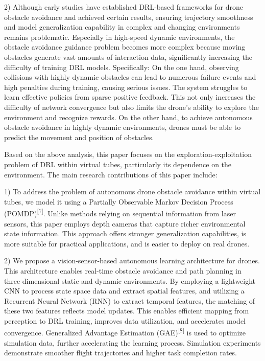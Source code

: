 \documentclass[preprint,12pt,authoryear]{elsarticle}
\begin{document}
2)  Although early studies have established DRL-based frameworks for drone obstacle avoidance and achieved certain results, ensuring trajectory smoothness and model generalization capability in complex and changing environments remains problematic. Especially in high-speed dynamic environments, the obstacle avoidance guidance problem becomes more complex because moving obstacles generate vast amounts of interaction data, significantly increasing the difficulty of training DRL models. Specifically: On the one hand, observing collisions with highly dynamic obstacles can lead to numerous failure events and high penalties during training, causing serious issues. The system struggles to learn effective policies from sparse positive feedback. This not only increases the difficulty of network convergence but also limits the drone's ability to explore the environment and recognize rewards. On the other hand, to achieve autonomous obstacle avoidance in highly dynamic environments, drones must be able to predict the movement and position of obstacles.

Based on the above analysis, this paper focuses on the exploration-exploitation problem of DRL within virtual tubes, particularly its dependence on the environment. The main research contributions of this paper include:

1)  To address the problem of autonomous drone obstacle avoidance within virtual tubes, we model it using a Partially Observable Markov Decision Process (POMDP)\textsuperscript{[7]}. Unlike methods relying on sequential information from laser sensors, this paper employs depth cameras that capture richer environmental state information. This approach offers stronger generalization capabilities, is more suitable for practical applications, and is easier to deploy on real drones.

2)  We propose a vision-sensor-based autonomous learning architecture for drones. This architecture enables real-time obstacle avoidance and path planning in three-dimensional static and dynamic environments. By employing a lightweight CNN to process state space data and extract spatial features, and utilizing a Recurrent Neural Network (RNN) to extract temporal features, the matching of these two features reflects model updates. This enables efficient mapping from perception to DRL training, improves data utilization, and accelerates model convergence. Generalized Advantage Estimation (GAE)\textsuperscript{[8]} is used to optimize simulation data, further accelerating the learning process. Simulation experiments demonstrate smoother flight trajectories and higher task completion rates.
\end{document}
